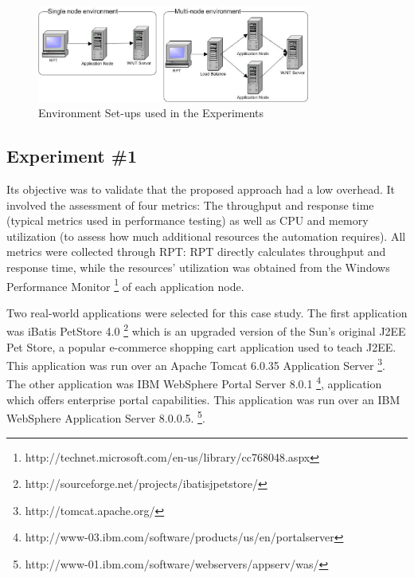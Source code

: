 \documentclass[runningheads,a4paper]{llncs}
\begin{document}
\begin{figure}[!h]
\centering
\includegraphics[totalheight=.25\textheight,width=0.8\textwidth]{Environments}
\caption{Environment Set-ups used in the Experiments}
\label{fig_env}
\end{figure}

\subsection{Experiment \#1}

Its objective was to validate that the proposed approach had a low overhead.
It involved the assessment of four metrics: The throughput and response time
(typical metrics used in performance testing) as well as CPU and memory utilization (to assess how much additional resources the automation
requires). All metrics were collected through RPT: RPT directly
calculates throughput and response time, while the resources' utilization was
obtained from the Windows Performance Monitor \footnote{http://technet.microsoft.com/en-us/library/cc768048.aspx} of each application node.

Two real-world applications were selected for this case study. The first
application was iBatis PetStore 4.0
\footnote{http://sourceforge.net/projects/ibatisjpetstore/} which is an 
upgraded version of the Sun's original J2EE Pet Store, a popular e-commerce
shopping cart application used to teach J2EE. This application was run over an Apache
Tomcat 6.0.35 Application Server \footnote{http://tomcat.apache.org/}. The
other application was IBM WebSphere Portal Server 8.0.1
\footnote{http://www-03.ibm.com/software/products/us/en/portalserver},
application which offers enterprise portal capabilities. This application was
run over an IBM WebSphere Application Server 8.0.0.5.
\footnote{http://www-01.ibm.com/software/webservers/appserv/was/}.
\end{document}
